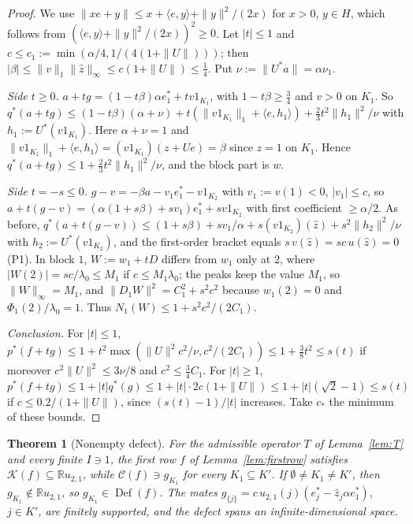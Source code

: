 \documentclass[10pt]{amsart}
\newtheorem{theorem}{Theorem}[section]
\theoremstyle{definition}
\theoremstyle{remark}
\newcommand{\R}{\mathbb R}
\newcommand{\Cset}{\mathcal C}
\newcommand{\Def}{\operatorname{Def}}
\newcommand{\zh}{\hat z}
\newcommand{\ip}[2]{\langle #1,#2\rangle}
\begin{document}
\begin{proof}
We use $\|xe+y\|\le x+\ip ey+\|y\|^2/(2x)$ for $x>0$, $y\in H$, which follows
from $(\ip ey+\|y\|^2/(2x))^2\ge0$.  Let $|t|\le1$ and $c\le c_1:=
\min(\alpha/4,1/(4(1+\|U\|)))$; then $|\beta|\le\|v\|_1\|\zh\|_\infty\le
c(1+\|U\|)\le\frac14$.  Put $\nu:=\|U^*a\|=\alpha\nu_1$.

\emph{Side $t\ge0$.}  $a+tg=(1-t\beta)\alpha e_1^*+tv1_{K_1}$, with
$1-t\beta\ge\frac34$ and $v>0$ on $K_1$.  So
$q^*(a+tg)\le(1-t\beta)(\alpha+\nu)+t(\|v1_{K_1}\|_1+\ip e{h_1})+\frac23t^2
\|h_1\|^2/\nu$ with $h_1:=U^*(v1_{K_1})$.  Here $\alpha+\nu=1$ and
$\|v1_{K_1}\|_1+\ip e{h_1}=(v1_{K_1})(z+Ue)=\beta$ since $z=1$ on $K_1$.
Hence $q^*(a+tg)\le1+\frac23t^2\|h_1\|^2/\nu$, and the block part is $w$.

\emph{Side $t=-s\le0$.}  $g-v=-\beta a-v_1e_1^*-v1_{K_2}$ with
$v_1:=v(1)<0$, $|v_1|\le c$, so $a+t(g-v)=(\alpha(1+s\beta)+sv_1)e_1^*+
sv1_{K_2}$ with first coefficient $\ge\alpha/2$.  As before,
$q^*(a+t(g-v))\le(1+s\beta)+sv_1/\alpha+s(v1_{K_2})(\zh)+s^2\|h_2\|^2/\nu$
with $h_2:=U^*(v1_{K_2})$, and the first-order bracket equals
$s\,v(\zh)=sc\,u(\zh)=0$ (P1).  In block $1$, $W:=w_1+tD$ differs from
$w_1$ only at $2$, where $|W(2)|=sc/\lambda_0\le M_1$ if $c\le M_1\lambda_0$;
the peaks keep the value $M_1$, so $\|W\|_\infty=M_1$, and
$\|D_1W\|^2=C_1^2+s^2c^2$ because $w_1(2)=0$ and $\Phi_1(2)/\lambda_0=1$.
Thus $N_1(W)\le1+s^2c^2/(2C_1)$.

\emph{Conclusion.}  For $|t|\le1$, $p^*(f+tg)\le1+t^2\max(\|U\|^2c^2/\nu,
c^2/(2C_1))\le1+\frac38t^2\le s(t)$ if moreover $c^2\|U\|^2\le3\nu/8$ and
$c^2\le\frac34C_1$.  For $|t|\ge1$, $p^*(f+tg)\le1+|t|q^*(g)\le1+|t|\cdot
2c(1+\|U\|)\le1+|t|(\sqrt2-1)\le s(t)$ if $c\le0.2/(1+\|U\|)$, since
$(s(t)-1)/|t|$ increases.  Take $c_*$ the minimum of these bounds.
\end{proof}

\begin{theorem}[Nonempty defect]\label{thm:defect}
For the admissible operator $T$ of Lemma~\ref{lem:T} and every finite
$I\ni1$, the first row $f$ of Lemma~\ref{lem:firstrow} satisfies
$\mathcal K(f)\subseteq\R u_{2,1}$, while $\Cset(f)\ni g_{K_1}$ for every
$K_1\subseteq K'$.  If $\emptyset\ne K_1\ne K'$, then $g_{K_1}\notin\R
u_{2,1}$, so $g_{K_1}\in\Def(f)$.  The mates $g_{\{j\}}=c\,u_{2,1}(j)
(e_j^*-\zh_j\alpha e_1^*)$, $j\in K'$, are finitely supported, and the
defect spans an infinite-dimensional space.
\end{theorem}
\end{document}
